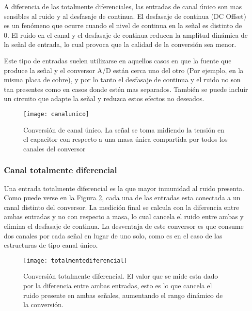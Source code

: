 A diferencia de las totalmente diferenciales, las entradas de canal único son mas sensibles al ruido y al desfasaje de continua. El desfasaje de continua (DC Offset) es un fenómeno que ocurre cuando el nivel de continua en la señal es distinto de 0. El ruido en el canal y el desfasaje de continua reducen la amplitud dinámica de la señal de entrada, lo cual provoca que la calidad de la conversión sea menor.\cite{dc_offset}

Este tipo de entradas suelen utilizarse en aquellos casos en que la fuente que produce la señal y el conversor A/D están cerca uno del otro (Por ejemplo, en la misma placa de cobre), y por lo tanto el desfasaje de continua y el ruido no son tan presentes como en casos donde estén mas separados. También se puede incluir un circuito que adapte la señal y reduzca estos efectos no deseados.\cite{tipos_canales}

\begin{figure}[h]
  \centering
  \texttt{[image: canalunico]}
  \caption{Conversión de canal único. La señal se toma midiendo la tensión en el capacitor con respecto a una masa única compartida por todos los canales del conversor}\label{fig:canalunico}
\end{figure}


\subsubsection{Canal totalmente diferencial}
\label{subs:canal_totalmente_diferencial}

Una entrada totalmente diferencial es la que mayor inmunidad al ruido presenta. Como puede verse en la Figura \ref{fig:totalmentediferencial}, cada una de las entradas esta conectada a un canal distinto del conversor. La medición final se calcula con la diferencia entre ambas entradas y no con respecto a masa, lo cual cancela el ruido entre ambas y elimina el desfasaje de continua. La desventaja de este conversor es que consume dos canales por cada señal en lugar de uno solo, como es en el caso de las estructuras de tipo canal único.\cite{tipos_canales}

\begin{figure}[h]
  \centering
  \texttt{[image: totalmentediferencial]}
  \caption{Conversión totalmente diferencial. El valor que se mide esta dado por la diferencia entre ambas entradas, esto es lo que cancela el ruido presente en ambas señales, aumentando el rango dinámico de la conversión.}\label{fig:totalmentediferencial}
\end{figure}

